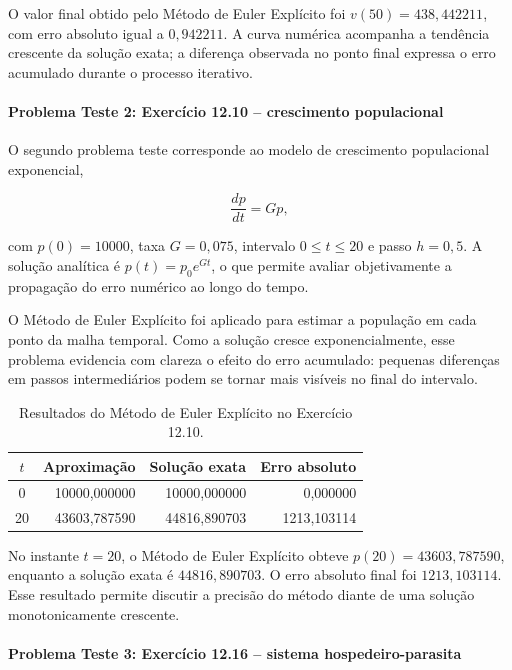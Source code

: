O valor final obtido pelo Método de Euler Explícito foi \(v(50)=438{,}442211\), com erro absoluto igual a \(0{,}942211\). A curva numérica acompanha a tendência crescente da solução exata; a diferença observada no ponto final expressa o erro acumulado durante o processo iterativo.

\paragraph{Problema Teste 2: Exercício 12.10 -- crescimento populacional}

O segundo problema teste corresponde ao modelo de crescimento populacional exponencial,

\[
    \frac{dp}{dt}=Gp,
\]

com \(p(0)=10000\), taxa \(G=0{,}075\), intervalo \(0\leq t\leq 20\) e passo \(h=0{,}5\). A solução analítica é \(p(t)=p_0e^{Gt}\), o que permite avaliar objetivamente a propagação do erro numérico ao longo do tempo.

O Método de Euler Explícito foi aplicado para estimar a população em cada ponto da malha temporal. Como a solução cresce exponencialmente, esse problema evidencia com clareza o efeito do erro acumulado: pequenas diferenças em passos intermediários podem se tornar mais visíveis no final do intervalo.

\begin{table}[H]
    \centering
    \caption{Resultados do Método de Euler Explícito no Exercício 12.10.}
    \begin{tabular}{c|r|r|r}
        \textbf{\(t\)} & \textbf{Aproximação} & \textbf{Solução exata} & \textbf{Erro absoluto} \\
        \hline
        0 & 10000{,}000000 & 10000{,}000000 & 0{,}000000 \\
        20 & 43603{,}787590 & 44816{,}890703 & 1213{,}103114 \\
    \end{tabular}
\end{table}

No instante \(t=20\), o Método de Euler Explícito obteve \(p(20)=43603{,}787590\), enquanto a solução exata é \(44816{,}890703\). O erro absoluto final foi \(1213{,}103114\). Esse resultado permite discutir a precisão do método diante de uma solução monotonicamente crescente.

\paragraph{Problema Teste 3: Exercício 12.16 -- sistema hospedeiro-parasita}

